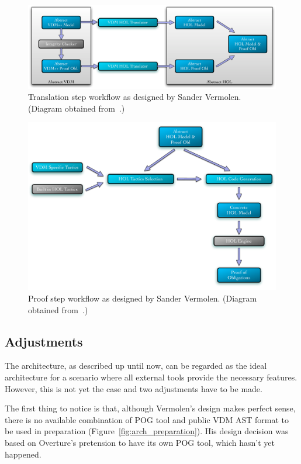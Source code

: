 \documentclass[]{article}
\begin{document}
\begin{figure}
  \begin{center}
  \includegraphics[width=.65\textwidth]{images/pic_translation.pdf}
  \caption[Translation workflow]{Translation step workflow as designed by Sander Vermolen. (Diagram obtained from~\cite{Vermolen07}.)}
  \label{fig:arch_translation}
  \end{center}
\end{figure}

\begin{figure}
  \begin{center}
  \includegraphics[width=.65\textwidth]{images/pic_proof.pdf}
  \caption[Proof workflow]{Proof step workflow as designed by Sander Vermolen. (Diagram obtained from~\cite{Vermolen07}.)}
  \label{fig:arch_proof}
  \end{center}
\end{figure}


\subsection{Adjustments}
\label{sub:adjustments}

The architecture, as described up until now, can be regarded as the ideal architecture for a scenario where all external tools provide the necessary features.
However, this is not yet the case and two adjustments have to be made.

The first thing to notice is that, although Vermolen's design makes perfect sense, there is no available combination of POG tool and public VDM AST format to be used in preparation (Figure~\ref{fig:arch_preparation}).
His design decision was based on Overture's pretension to have its own POG tool, which hasn't yet happened.
\end{document}
